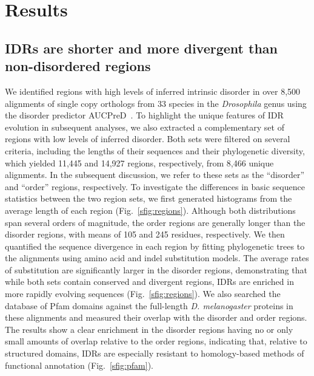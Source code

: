 \section{Results}
\subsection{IDRs are shorter and more divergent than non-disordered regions}
We identified regions with high levels of inferred intrinsic disorder in over 8,500 alignments of single copy orthologs from 33 species in the \textit{Drosophila} genus using the disorder predictor AUCPreD~\cite{Wang2016}. To highlight the unique features of IDR evolution in subsequent analyses, we also extracted a complementary set of regions with low levels of inferred disorder. Both sets were filtered on several criteria, including the lengths of their sequences and their phylogenetic diversity, which yielded 11,445 and 14,927 regions, respectively, from 8,466 unique alignments. In the subsequent discussion, we refer to these sets as the ``disorder'' and ``order'' regions, respectively. To investigate the differences in basic sequence statistics between the two region sets, we first generated histograms from the average length of each region (Fig.~\ref{sfig:regions}). Although both distributions span several orders of magnitude, the order regions are generally longer than the disorder regions, with means of 105 and 245 residues, respectively. We then quantified the sequence divergence in each region by fitting phylogenetic trees to the alignments using amino acid and indel substitution models. The average rates of substitution are significantly larger in the disorder regions, demonstrating that while both sets contain conserved and divergent regions, IDRs are enriched in more rapidly evolving sequences (Fig.~\ref{sfig:regions}). We also searched the database of Pfam domains against the full-length \textit{D. melanogaster} proteins in these alignments and measured their overlap with the disorder and order regions. The results show a clear enrichment in the disorder regions having no or only small amounts of overlap relative to the order regions, indicating that, relative to structured domains, IDRs are especially resistant to homology-based methods of functional annotation (Fig.~\ref{sfig:pfam}).

